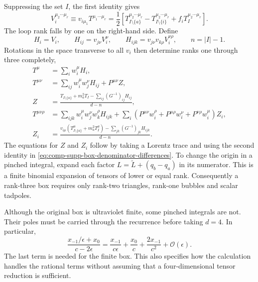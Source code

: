 Suppressing the set $I$, the first identity gives
\begin{equation}
 V_i^{\mu_2\cdots\mu_r}
 \equiv v_{i\mu_1}T^{\mu_1\cdots\mu_r}
 =\frac12\left[
 T_{I\setminus\{a\}}^{\mu_2\cdots\mu_r}
 -T_{I\setminus\{i\}}^{\mu_2\cdots\mu_r}
 +f_iT_I^{\mu_2\cdots\mu_r}\right].
 \label{eq:comp-supp-box-pinch-recurrence}
\end{equation}
The loop rank falls by one on the right-hand side. Define
\begin{equation}
 H_i=V_i,\qquad
 H_{ij}=v_{j\nu}V_i^\nu,\qquad
 H_{ijk}=v_{j\nu}v_{k\rho}V_i^{\nu\rho},\qquad
 n=|I|-1.
\end{equation}
Rotations in the space transverse to all $v_i$ then determine
ranks one through three completely,
\begin{align}
 T^\mu&=\sum_iw_i^\mu H_i,\\
 T^{\mu\nu}&=\sum_{ij}w_i^\mu w_j^\nu H_{ij}
                      +P^{\mu\nu}Z,\\
 Z&=\frac{T_{I\setminus\{a\}}+m_a^2T_I
                   -\sum_{ij}(G^{-1})_{ij}H_{ij}}{d-n},\\
 T^{\mu\nu\rho}&=\sum_{ijk}w_i^\mu w_j^\nu w_k^\rho H_{ijk}
       +\sum_i\left(P^{\mu\nu}w_i^\rho
                   +P^{\mu\rho}w_i^\nu
                   +P^{\nu\rho}w_i^\mu\right)Z_i,\\
 Z_i&=\frac{v_{i\mu}
       (T_{I\setminus\{a\}}^\mu+m_a^2T_I^\mu)
                 -\sum_{jk}(G^{-1})_{jk}H_{ijk}}{d-n}.
 \label{eq:comp-supp-box-rank-three}
\end{align}
The equations for $Z$ and $Z_i$ follow by taking a Lorentz trace
and using the second identity in
\eqref{eq:comp-supp-box-denominator-differences}.
To change the origin in a pinched integral, expand each factor
$L=\widetilde L+(q_b-q_a)$ in its numerator. This is a finite
binomial expansion of tensors of lower or equal rank.
Consequently a rank-three box requires only rank-two triangles,
rank-one bubbles and scalar tadpoles.

Although the original box is ultraviolet finite, some pinched
integrals are not. Their poles must be carried through the
recurrence before taking $d=4$. In particular,
\begin{equation}
 \frac{x_{-1}/\epsilon+x_0}{c-2\epsilon}
 =\frac{x_{-1}}{c\epsilon}+\frac{x_0}{c}
                          +\frac{2x_{-1}}{c^2}
                          +\mathcal O(\epsilon).
 \label{eq:comp-supp-box-rational-finite}
\end{equation}
The last term is needed for the finite box. This also specifies
how the calculation handles the rational terms without assuming
that a four-dimensional tensor reduction is sufficient.

